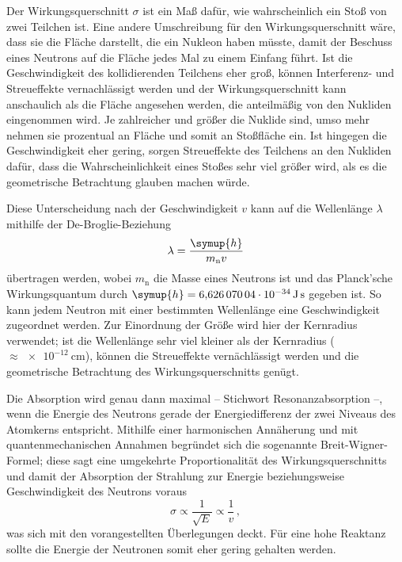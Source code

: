 Der Wirkungsquerschnitt $\sigma$ ist ein Maß dafür, wie wahrscheinlich ein Stoß von zwei Teilchen ist. 
Eine andere Umschreibung für den Wirkungsquerschnitt wäre, dass sie die Fläche darstellt, die ein Nukleon haben müsste, 
damit der Beschuss eines Neutrons auf die Fläche jedes Mal zu einem Einfang führt. 
Ist die Geschwindigkeit des kollidierenden Teilchens eher groß, können Interferenz- und Streueffekte vernachlässigt werden
und der Wirkungsquerschnitt kann anschaulich als die Fläche angesehen werden, die anteilmäßig von den Nukliden eingenommen wird. 
Je zahlreicher und größer die Nuklide sind, umso mehr nehmen sie prozentual an Fläche und somit an Stoßfläche ein. 
Ist hingegen die Geschwindigkeit eher gering, sorgen Streueffekte des Teilchens an den Nukliden dafür, dass die Wahrscheinlichkeit 
eines Stoßes sehr viel größer wird, als es die geometrische Betrachtung glauben machen würde\cite{Versuchsanleitung}. 

Diese Unterscheidung nach der Geschwindigkeit $v$ kann auf die Wellenlänge $\lambda$ mithilfe der De-Broglie-Beziehung
\begin{equation*}
    \lambda = \frac{\symup{h}}{m_\text{n}v}
\end{equation*}
übertragen werden, wobei $m_\text{n}$ die Masse eines Neutrons ist und das Planck'sche Wirkungsquantum durch ${\symup{h}=\SI{6.62607004e-34}{\joule\second}}$ \cite{scipy} gegeben ist. 
So kann jedem Neutron mit einer bestimmten Wellenlänge eine Geschwindigkeit zugeordnet werden. 
Zur Einordnung der Größe wird hier der Kernradius verwendet; ist die Wellenlänge sehr viel kleiner als der Kernradius ($\approx \SI{e-12}{\centi\meter}$), 
können die Streueffekte vernächlässigt werden und die geometrische Betrachtung des Wirkungsquerschnitts genügt. 

Die Absorption wird genau dann maximal -- Stichwort Resonanzabsorption --, wenn die Energie des Neutrons gerade der Energiedifferenz 
der zwei Niveaus des Atomkerns entspricht. Mithilfe einer harmonischen Annäherung und mit quantenmechanischen Annahmen begründet 
sich die sogenannte Breit-Wigner-Formel; diese sagt eine umgekehrte Proportionalität des Wirkungsquerschnitts und damit der 
Absorption der Strahlung zur Energie beziehungsweise Geschwindigkeit des Neutrons voraus
\begin{equation*}
    \sigma \propto \frac{1}{\sqrt{E}} \propto \frac{1}{v} \,,
\end{equation*}
was sich mit den vorangestellten Überlegungen deckt\cite{Versuchsanleitung}. 
Für eine hohe Reaktanz sollte die Energie der Neutronen somit eher gering gehalten werden.

